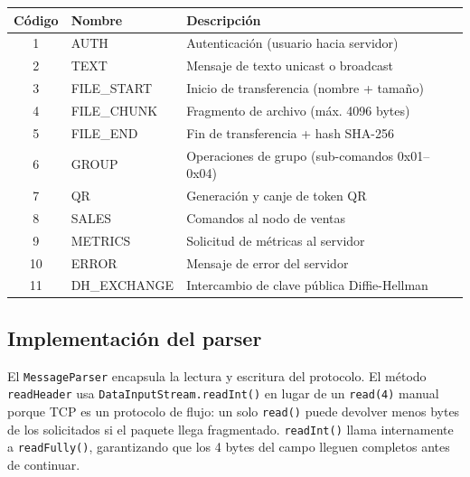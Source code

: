 \documentclass[12pt,a4paper]{article}
\begin{document}
\begin{center}
\begin{tabular}{cll}
\toprule
\textbf{Código} & \textbf{Nombre} & \textbf{Descripción} \\
\midrule
1  & AUTH         & Autenticación (usuario hacia servidor) \\
2  & TEXT         & Mensaje de texto unicast o broadcast \\
3  & FILE\_START  & Inicio de transferencia (nombre + tamaño) \\
4  & FILE\_CHUNK  & Fragmento de archivo (máx. 4096 bytes) \\
5  & FILE\_END    & Fin de transferencia + hash SHA-256 \\
6  & GROUP        & Operaciones de grupo (sub-comandos 0x01--0x04) \\
7  & QR           & Generación y canje de token QR \\
8  & SALES        & Comandos al nodo de ventas \\
9  & METRICS      & Solicitud de métricas al servidor \\
10 & ERROR        & Mensaje de error del servidor \\
11 & DH\_EXCHANGE & Intercambio de clave pública Diffie-Hellman \\
\bottomrule
\end{tabular}
\end{center}

\subsection{Implementación del parser}

El \texttt{MessageParser} encapsula la lectura y escritura del protocolo.
El método \texttt{readHeader} usa \texttt{DataInputStream.readInt()} en lugar
de un \texttt{read(4)} manual porque TCP es un protocolo de flujo: un solo
\texttt{read()} puede devolver menos bytes de los solicitados si el paquete
llega fragmentado. \texttt{readInt()} llama internamente a \texttt{readFully()},
garantizando que los 4 bytes del campo lleguen completos antes de continuar.
\end{document}
